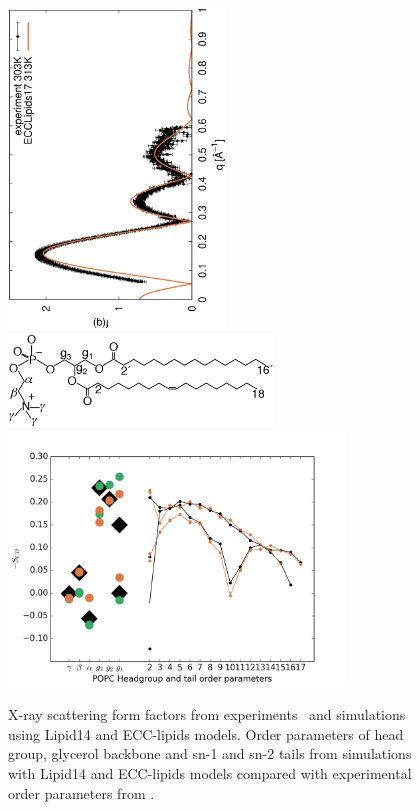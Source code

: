 \documentclass[aip,jcp,twocolumn]{revtex4}
\begin{document}
\begin{figure}[tbp]
  \centering
  \includegraphics[height=8.5cm,angle=-90]{../Fig/form-f_exp-l14-eccl17.eps}
  \includegraphics[width=7.0cm]{../Fig/POPCstructure.eps}
  \includegraphics[width=9.0cm]{../Fig/ipython_nb/Order-parameters_exp-L14-ECCL17_q80_sig89.png}
  \caption{\label{simVSexpNOions}
    X-ray scattering form factors from experiments~\cite{Kucerka2011} and simulations using Lipid14 \cite{dickson14} and ECC-lipids models. 
    Order parameters of head group, glycerol backbone and sn-1 and sn-2 tails  from simulations with Lipid14 \cite{dickson14} and ECC-lipids models
    compared with experimental order parameters from \cite{ferreira13}.}
\end{figure}
\end{document}
